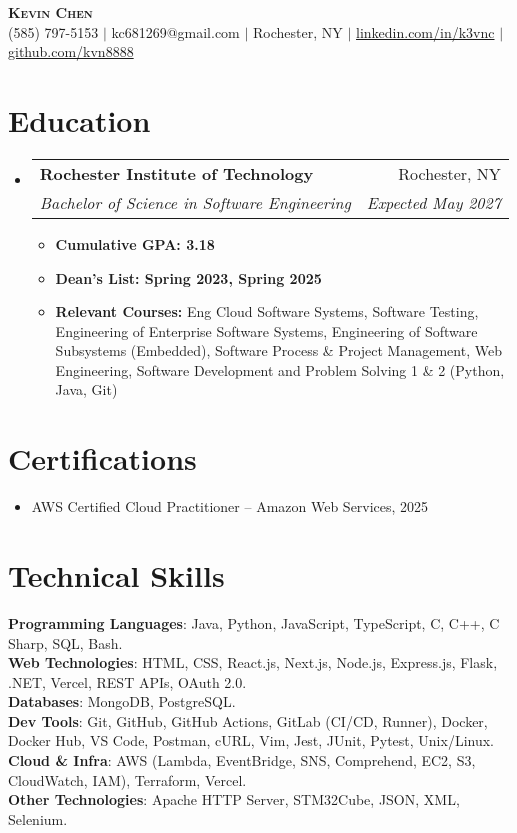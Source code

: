 \documentclass[letterpaper,11pt]{article}
\makeatletter
\newcommand{\resumeItem}[1]{
  \item\small{
    {#1 \vspace{-2pt}}
  }
}
\newcommand{\resumeSubheading}[4]{
  \vspace{-2pt}\item
    \begin{tabular*}{0.97\textwidth}[t]{l@{\extracolsep{\fill}}r}
      \textbf{#1} & #2 \\
      \textit{\small#3} & \textit{\small #4} \\
    \end{tabular*}\vspace{-7pt}
}
\newcommand{\resumeSubHeadingListStart}{\begin{itemize}[leftmargin=0.15in, label={}]}
\newcommand{\resumeSubHeadingListEnd}{\end{itemize}}
\newcommand{\resumeItemListStart}{\begin{itemize}}
\newcommand{\resumeItemListEnd}{\end{itemize}\vspace{-5pt}}
\makeatother
\begin{document}
\begin{center}
    \textbf{\Huge \scshape Kevin Chen} \\ \vspace{1pt}
    \small (585) 797-5153 $|$ kc681269@gmail.com $|$ Rochester, NY $|$ 
    \href{https://www.linkedin.com/in/k3vnc/}{linkedin.com/in/k3vnc} $|$ 
    \href{https://github.com/kvn8888}{github.com/kvn8888}
\end{center}

\section{Education}
  \resumeSubHeadingListStart
    \resumeSubheading
      {Rochester Institute of Technology}{Rochester, NY}
      {Bachelor of Science in Software Engineering}{Expected May 2027}
      \resumeItemListStart
        \resumeItem{\textbf{Cumulative GPA: 3.18}}
        \resumeItem{\textbf{Dean's List: Spring 2023, Spring 2025}}
        \resumeItem{\textbf{Relevant Courses:} Eng Cloud Software Systems, Software Testing, Engineering of Enterprise Software Systems, Engineering of Software Subsystems (Embedded), Software Process \& Project Management, Web Engineering, Software Development and Problem Solving 1 \& 2 (Python, Java, Git)}
      \resumeItemListEnd
  \resumeSubHeadingListEnd

\section{Certifications}
  \resumeSubHeadingListStart
    \resumeItem{AWS Certified Cloud Practitioner -- Amazon Web Services, 2025}
  \resumeSubHeadingListEnd

\section{Technical Skills}
\begin{itemize}[leftmargin=0.15in, label={}]
\small{\item{
\textbf{Programming Languages}{: Java, Python, JavaScript, TypeScript, C, C++, C Sharp, SQL, Bash.} \\
\textbf{Web Technologies}{: HTML, CSS, React.js, Next.js, Node.js, Express.js, Flask, .NET, Vercel, REST APIs, OAuth 2.0.} \\
\textbf{Databases}{: MongoDB, PostgreSQL.} \\
\textbf{Dev Tools}{: Git, GitHub, GitHub Actions, GitLab (CI/CD, Runner), Docker, Docker Hub, VS Code, Postman, cURL, Vim, Jest, JUnit, Pytest, Unix/Linux.} \\
\textbf{Cloud \& Infra}{: AWS (Lambda, EventBridge, SNS, Comprehend, EC2, S3, CloudWatch, IAM), Terraform, Vercel.} \\
\textbf{Other Technologies}{: Apache HTTP Server, STM32Cube, JSON, XML, Selenium.}}}\\
\end{itemize}
\end{document}
